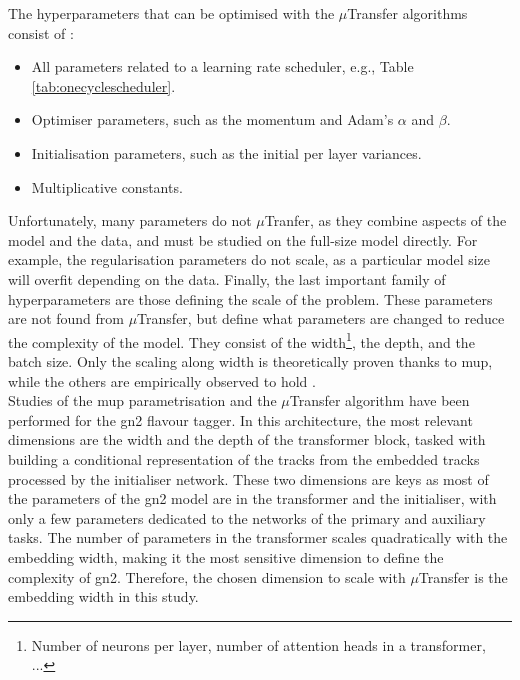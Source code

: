 The hyperparameters that can be optimised with the $\mu$Transfer algorithms consist of \cite{yang2021tuning}: 
\begin{itemize}
  \item All parameters related to a learning rate scheduler, e.g., Table \ref{tab:onecyclescheduler}.
  \item Optimiser parameters, such as the momentum and Adam's $\alpha$ and $\beta$.
  \item Initialisation parameters, such as the initial per layer variances.
  \item Multiplicative constants.
\end{itemize}
Unfortunately, many parameters do not $\mu$Tranfer, as they combine aspects of the model and the data, and must be studied on the full-size model directly. For example, the regularisation parameters do not scale, as a particular model size will overfit depending on the data. Finally, the last important family of hyperparameters are those defining the scale of the problem. These parameters are not found from $\mu$Transfer, but define what parameters are changed to reduce the complexity of the model. They consist of the width\footnote{Number of neurons per layer, number of attention heads in a transformer, ...}, the depth, and the batch size. Only the scaling along width is theoretically proven thanks to \gls{mup}, while the others are empirically observed to hold \cite{yang2021tuning}.\\

Studies of the \gls{mup} parametrisation and the $\mu$Transfer algorithm have been performed for the \gls{gn2} flavour tagger. In this architecture, the most relevant dimensions are the width and the depth of the transformer block, tasked with building a conditional representation of the tracks from the embedded tracks processed by the initialiser network. These two dimensions are keys as most of the parameters of the \gls{gn2} model are in the transformer and the initialiser, with only a few parameters dedicated to the networks of the primary and auxiliary tasks. The number of parameters in the transformer scales quadratically with the embedding width, making it the most sensitive dimension to define the complexity of \gls{gn2}. Therefore, the chosen dimension to scale with $\mu$Transfer is the embedding width in this study. \\

